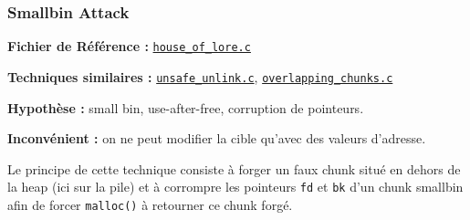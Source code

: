 \subsubsection{Smallbin Attack}

\noindent\textbf{Fichier de Référence :}
\href{https://github.com/shellphish/how2heap/blob/master/glibc_2.41/house_of_lore.c}{\texttt{house\_of\_lore.c}}

\noindent\textbf{Techniques similaires :}
\href{https://github.com/shellphish/how2heap/blob/master/glibc_2.41/unsafe_unlink.c}{\texttt{unsafe\_unlink.c}},
\href{https://github.com/shellphish/how2heap/blob/master/glibc_2.41/overlapping_chunks.c}{\texttt{overlapping\_chunks.c}}

\noindent\textbf{Hypothèse :} small bin, use-after-free, corruption de pointeurs.

\noindent\textbf{Inconvénient :} on ne peut modifier la cible qu’avec des valeurs d’adresse.

Le principe de cette technique consiste à forger un faux chunk situé en dehors de la heap
(ici sur la pile) et à corrompre les pointeurs \texttt{fd} et \texttt{bk} d’un chunk
smallbin afin de forcer \texttt{malloc()} à retourner ce chunk forgé.


